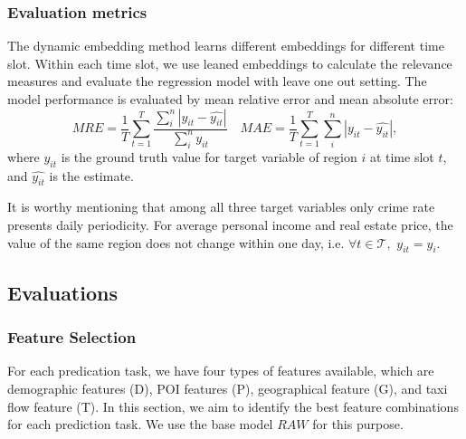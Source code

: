 \subsubsection{Evaluation metrics}

The dynamic embedding method learns different embeddings for different time slot. Within each time slot, we use leaned embeddings to calculate the relevance measures and evaluate the regression model with leave one out setting. The model performance is evaluated by mean relative error and mean absolute error:
\begin{equation*}
MRE = \frac{1}{T} \sum_{t=1}^T \frac{\sum_i^n |y_{it} - \hat{y_{it}}|}{\sum_i^n y_{it}} \quad
MAE = \frac{1}{T} \sum_{t=1}^T \sum_i^n |y_{it} - \hat{y_{it}}|,
\end{equation*} 
where $y_{it}$ is the ground truth value for target variable of region $i$ at time slot $t$, and $\hat{y_{it}}$ is the estimate.

It is worthy mentioning that among all three target variables only crime rate presents daily periodicity. For average personal income and real estate price, the value of the same region does not change within one day, i.e. $\forall t \in \mathcal{T},$ $y_{it} = y_i$.









\subsection{Evaluations}

\subsubsection{Feature Selection}

For each predication task, we have four types of features available, which are demographic features (D), POI features (P), geographical feature (G), and taxi flow feature (T). In this section, we aim to identify the best feature combinations for each prediction task. We use the base model $RAW$ for this purpose.



